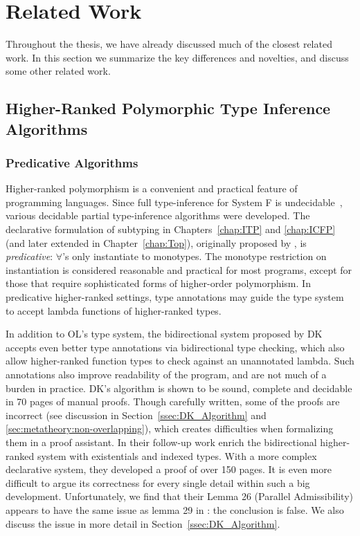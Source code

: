 \chapter{Related Work}
\label{chap:related}

Throughout the thesis, we have already discussed much of the closest related work.
In this section we summarize the key differences and novelties,
and discuss some other related work.

\section{Higher-Ranked Polymorphic Type Inference Algorithms}

\subsection{Predicative Algorithms}

Higher-ranked polymorphism is a convenient and practical feature of
programming languages.  Since full type-inference for System F is
undecidable~\citep{wells1999typability}, various decidable partial
type-inference algorithms were developed.
The declarative formulation of subtyping in Chapters~\ref{chap:ITP} and \ref{chap:ICFP}
(and later extended in Chapter~\ref{chap:Top}),
originally proposed by \citet{odersky1996putting}, is \emph{predicative}:
$\forall$'s only instantiate to monotypes.  The monotype restriction
on instantiation is considered reasonable and practical for most
programs, except for those that require sophisticated forms of
higher-order polymorphism.
In predicative higher-ranked settings, type annotations may guide the type system to
accept lambda functions of higher-ranked types.

In addition to OL's type system,
the bidirectional system proposed by DK~\citep{dunfield2013complete}
accepts even better type annotations via bidirectional type checking,
which also allow higher-ranked function types to check against an unannotated lambda.
Such annotations also improve readability of the program,
and are not much of a burden in practice.
DK's algorithm is shown to be sound, complete and decidable in 70 pages of manual proofs.
Though carefully written, some of the proofs are incorrect
(see discussion in Section~\ref{ssec:DK_Algorithm} and
\ref{sec:metatheory:non-overlapping}),
which creates difficulties when formalizing them in a proof assistant.
In their follow-up work \citet{DunfieldIndexed} enrich the bidirectional higher-ranked system with
existentials and indexed types.
With a more complex declarative system, they developed a proof of over 150 pages.
It is even more difficult to argue its correctness for every single detail
within such a big development.
Unfortunately, we find that their Lemma 26 (Parallel Admissibility) appears to have the same issue 
as lemma 29 in \citep{dunfield2013complete}: the conclusion is false. We also discuss
the issue in more detail in Section~\ref{ssec:DK_Algorithm}.

